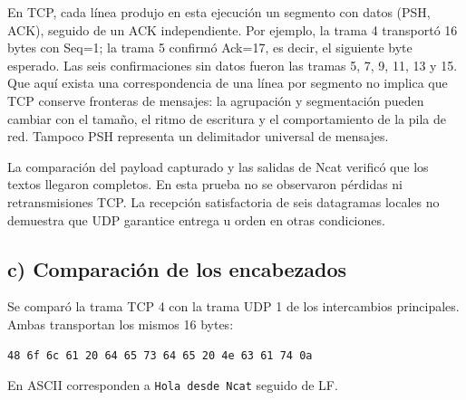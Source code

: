 \documentclass[12pt,a4paper]{article}
\begin{document}
En TCP, cada línea produjo en esta ejecución un segmento con datos
(PSH, ACK), seguido de un ACK independiente. Por ejemplo, la trama 4
transportó 16 bytes con Seq=1; la trama 5 confirmó Ack=17, es decir, el
siguiente byte esperado. Las seis confirmaciones sin datos fueron las
tramas 5, 7, 9, 11, 13 y 15. Que aquí exista una correspondencia de una
línea por segmento no implica que TCP conserve fronteras de mensajes:
la agrupación y segmentación pueden cambiar con el tamaño, el ritmo de
escritura y el comportamiento de la pila de red. Tampoco PSH representa
un delimitador universal de mensajes.

La comparación del payload capturado y las salidas de Ncat verificó que
los textos llegaron completos. En esta prueba no se observaron pérdidas
ni retransmisiones TCP. La recepción satisfactoria de seis datagramas
locales no demuestra que UDP garantice entrega u orden en otras condiciones.

\subsection{c) Comparación de los encabezados}

Se comparó la trama TCP 4 con la trama UDP 1 de los intercambios
principales. Ambas transportan los mismos 16 bytes:
\par\noindent\begin{minipage}{\linewidth}
\begin{verbatim}
48 6f 6c 61 20 64 65 73 64 65 20 4e 63 61 74 0a
\end{verbatim}
\end{minipage}\par
En ASCII corresponden a \texttt{Hola desde Ncat} seguido de LF.
\end{document}
